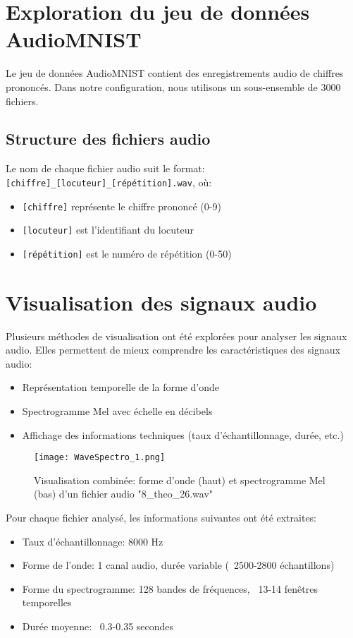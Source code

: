 \documentclass[11pt,a4paper]{article}
\begin{document}
\section{Exploration du jeu de données AudioMNIST}
\label{sec:exploration}

Le jeu de données AudioMNIST contient des enregistrements audio de chiffres prononcés. Dans notre configuration, nous utilisons un sous-ensemble de 3000 fichiers.

\subsection{Structure des fichiers audio}
\label{subsec:structure}

Le nom de chaque fichier audio suit le format: \texttt{[chiffre]\_[locuteur]\_[répétition].wav}, où:
\begin{itemize}
    \item \texttt{[chiffre]} représente le chiffre prononcé (0-9)
    \item \texttt{[locuteur]} est l'identifiant du locuteur
    \item \texttt{[répétition]} est le numéro de répétition (0-50)
\end{itemize}

\section{Visualisation des signaux audio}
\label{sec:visualisation}

Plusieurs méthodes de visualisation ont été explorées pour analyser les signaux audio.
Elles permettent de mieux comprendre les caractéristiques des signaux audio:
\begin{itemize}
    \item Représentation temporelle de la forme d'onde
    \item Spectrogramme Mel avec échelle en décibels
    \item Affichage des informations techniques (taux d'échantillonnage, durée, etc.)
\end{itemize}

\begin{figure}[H]
    \centering
    \texttt{[image: WaveSpectro\_1.png]}
    \caption{Visualisation combinée: forme d'onde (haut) et spectrogramme Mel (bas) d'un fichier audio "8\_theo\_26.wav"}
    \label{fig:waveform_spec_1}
\end{figure}

Pour chaque fichier analysé, les informations suivantes ont été extraites:
\begin{itemize}
    \item Taux d'échantillonnage: 8000 Hz
    \item Forme de l'onde: 1 canal audio, durée variable (~2500-2800 échantillons)
    \item Forme du spectrogramme: 128 bandes de fréquences, ~13-14 fenêtres temporelles
    \item Durée moyenne: ~0.3-0.35 secondes
\end{itemize}
\end{document}
